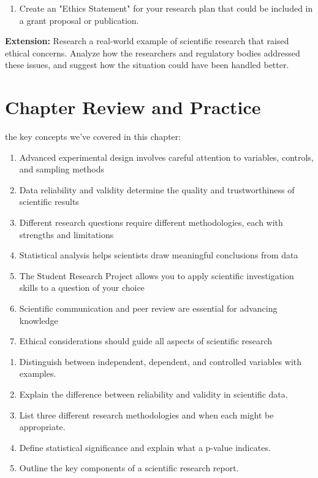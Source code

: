 \documentclass[justified,notoc]{tufte-book}
\newenvironment{investigation}[1]{%
    \begin{tcolorbox}[colback=info!10,colframe=info,title=\textbf{Investigation: #1}]
}{%
    \end{tcolorbox}
}
\newenvironment{tieredquestions}[1]{%
    \begin{tcolorbox}[colback=note!30,colframe=note!50,title=\textbf{Practice Questions - #1}]
}{%
    \end{tcolorbox}
}
\begin{document}
\begin{investigation}{Ethical Research Design}
\begin{enumerate}
    \item Create an "Ethics Statement" for your research plan that could be included in a grant proposal or publication.
\end{enumerate}

\textbf{Extension:} Research a real-world example of scientific research that raised ethical concerns. Analyze how the researchers and regulatory bodies addressed these issues, and suggest how the situation could have been handled better.
\end{investigation}

\section{Chapter Review and Practice}

 the key concepts we've covered in this chapter:

\begin{enumerate}
    \item Advanced experimental design involves careful attention to variables, controls, and sampling methods
    \item Data reliability and validity determine the quality and trustworthiness of scientific results
    \item Different research questions require different methodologies, each with strengths and limitations
    \item Statistical analysis helps scientists draw meaningful conclusions from data
    \item The Student Research Project allows you to apply scientific investigation skills to a question of your choice
    \item Scientific communication and peer review are essential for advancing knowledge
    \item Ethical considerations should guide all aspects of scientific research
\end{enumerate}

\begin{tieredquestions}{Level 1 - Basic Understanding}
\begin{enumerate}
    \item Distinguish between independent, dependent, and controlled variables with examples.
    \item Explain the difference between reliability and validity in scientific data.
    \item List three different research methodologies and when each might be appropriate.
    \item Define statistical significance and explain what a p-value indicates.
    \item Outline the key components of a scientific research report.
\end{enumerate}
\end{tieredquestions}
\end{document}
